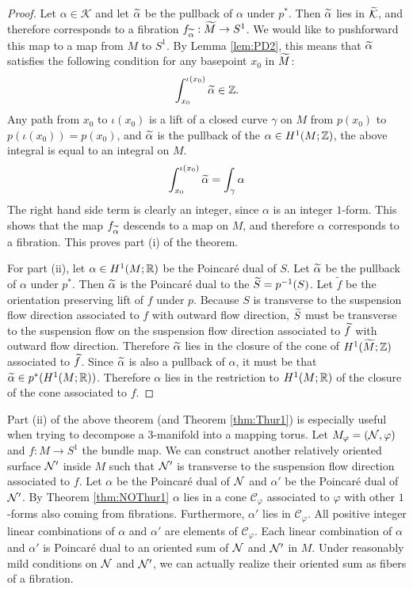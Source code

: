 \begin{proof}
  Let $\alpha\in\mathcal{K}$ and let $\widetilde{\alpha}$ be the pullback of $\alpha$ under $p^\ast$. Then $\widetilde{\alpha}$ lies in $\widetilde{\mathcal{K}}$,
  and therefore corresponds to a fibration $f_{\widetilde{\alpha}}: \widetilde{M} \to S^1$. We would like
  to pushforward this map to a map from $M$ to $S^1$. By Lemma \ref{lem:PD2}, this means that $\widetilde{\alpha}$ satisfies the following condition
  for any basepoint $x_0$ in $\widetilde{M}$:
  \begin{align*}
    \int_{x_0}^{\iota(x_0)} \widetilde{\alpha} \in \mathbb{Z}.
  \end{align*}
  Any path from $x_0$ to $\iota(x_0)$ is a lift of a closed curve $\gamma$
  on $M$ from $p(x_0)$ to $p(\iota(x_0)) = p(x_0)$, and $\widetilde{\alpha}$ is the pullback of
  the $\alpha \in H^1(M; \mathbb{Z})$, the above integral is equal to an integral on $M$.
  \begin{align*}
    \int_{x_0}^{\iota(x_0)} \widetilde{\alpha} = \int_{\gamma} \alpha
  \end{align*}
  The right hand side term is clearly an integer, since $\alpha$ is an integer $1$-form. This
  shows that the map $f_{\widetilde{\alpha}}$ descends to a map on $M$, and therefore $\alpha$ corresponds
  to a fibration. This proves part (i) of the theorem.

  For part (ii), let $\alpha\in H^1(M;\mathbb{R})$ be the Poincar\'e dual of $S$. Let $\widetilde{\alpha}$ be the pullback of $\alpha$ under $p^\ast$.  Then $\widetilde{\alpha}$ is the Poincar\'e dual to the $\widetilde{S}=p^{-1}(S)$.  Let $\widetilde{f}$ be the orientation preserving lift of $f$ under $p$.  Because $S$ is
  transverse to the suspension flow direction associated to $f$ with outward flow direction, $\widetilde{S}$ must be transverse to the suspension flow on the suspension flow direction associated to $\widetilde{f}$ with outward flow direction. Therefore $\widetilde{\alpha}$ lies in the closure of the cone of $H^1(\widetilde{M};\mathbb{Z})$ associated to $\widetilde{f}$. Since $\widetilde{\alpha}$ is also a pullback of $\alpha$, it must be that $\widetilde{\alpha}\in p^\ast(H^1(M;\mathbb{R}))$. Therefore $\alpha$ lies in the restriction to $H^1(M;\mathbb{R})$ of the closure of the cone associated to $f$.
\end{proof}

Part (ii) of the above theorem (and Theorem \ref{thm:Thur1}) is especially useful when trying to
decompose a $3$-manifold into a mapping torus. Let
$M_\varphi = (\mathcal{N}, \varphi)$ and $f:M\rightarrow S^1$ the bundle map. We can construct another relatively oriented surface $\mathcal{N}'$ inside $M$ such that
$\mathcal{N}'$ is transverse to the suspension flow direction associated to $f$. Let $\alpha$ be the Poincar\'e dual of $\mathcal{N}$ and $\alpha'$ be the Poincar\'e dual of $\mathcal{N}'$.  By Theorem \ref{thm:NOThur1} $\alpha$ lies in a cone $\mathcal{C}_\varphi$ associated to $\varphi$ with other $1$-forms also coming from fibrations. Furthermore, $\alpha'$ lies in $\mathcal{C}_\varphi$. All positive
integer linear combinations of $\alpha$ and $\alpha'$ are elements of $\mathcal{C}_\varphi$. Each linear combination of $\alpha$ and $\alpha'$ is Poincar\'e dual to an oriented sum of $\mathcal{N}$ and $\mathcal{N}'$ in $M$. Under reasonably mild conditions on $\mathcal{N}$ and $\mathcal{N}'$, we can actually realize their oriented sum as
fibers of a fibration.

